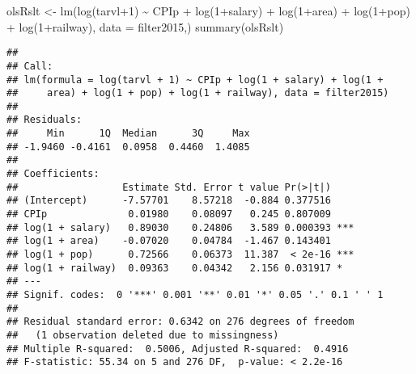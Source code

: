 \documentclass[
]{article}
\newenvironment{Shaded}{\begin{snugshade}}{\end{snugshade}}
\newcommand{\AttributeTok}[1]{\textcolor[rgb]{0.77,0.63,0.00}{#1}}
\newcommand{\DecValTok}[1]{\textcolor[rgb]{0.00,0.00,0.81}{#1}}
\newcommand{\FunctionTok}[1]{\textcolor[rgb]{0.00,0.00,0.00}{#1}}
\newcommand{\NormalTok}[1]{#1}
\newcommand{\OtherTok}[1]{\textcolor[rgb]{0.56,0.35,0.01}{#1}}
\newcommand{\SpecialCharTok}[1]{\textcolor[rgb]{0.00,0.00,0.00}{#1}}
\begin{document}
\begin{Shaded}
\begin{Highlighting}[]
\NormalTok{olsRslt }\OtherTok{\textless{}{-}} \FunctionTok{lm}\NormalTok{(}\FunctionTok{log}\NormalTok{(tarvl}\SpecialCharTok{+}\DecValTok{1}\NormalTok{) }\SpecialCharTok{\textasciitilde{}}\NormalTok{ CPIp }\SpecialCharTok{+}
                \FunctionTok{log}\NormalTok{(}\DecValTok{1}\SpecialCharTok{+}\NormalTok{salary) }\SpecialCharTok{+}
                \FunctionTok{log}\NormalTok{(}\DecValTok{1}\SpecialCharTok{+}\NormalTok{area) }\SpecialCharTok{+} \FunctionTok{log}\NormalTok{(}\DecValTok{1}\SpecialCharTok{+}\NormalTok{pop) }\SpecialCharTok{+}
                \FunctionTok{log}\NormalTok{(}\DecValTok{1}\SpecialCharTok{+}\NormalTok{railway),}
              \AttributeTok{data =}\NormalTok{ filter2015,)}
\FunctionTok{summary}\NormalTok{(olsRslt)}
\end{Highlighting}
\end{Shaded}

\begin{verbatim}
## 
## Call:
## lm(formula = log(tarvl + 1) ~ CPIp + log(1 + salary) + log(1 + 
##     area) + log(1 + pop) + log(1 + railway), data = filter2015)
## 
## Residuals:
##     Min      1Q  Median      3Q     Max 
## -1.9460 -0.4161  0.0958  0.4460  1.4085 
## 
## Coefficients:
##                  Estimate Std. Error t value Pr(>|t|)    
## (Intercept)      -7.57701    8.57218  -0.884 0.377516    
## CPIp              0.01980    0.08097   0.245 0.807009    
## log(1 + salary)   0.89030    0.24806   3.589 0.000393 ***
## log(1 + area)    -0.07020    0.04784  -1.467 0.143401    
## log(1 + pop)      0.72566    0.06373  11.387  < 2e-16 ***
## log(1 + railway)  0.09363    0.04342   2.156 0.031917 *  
## ---
## Signif. codes:  0 '***' 0.001 '**' 0.01 '*' 0.05 '.' 0.1 ' ' 1
## 
## Residual standard error: 0.6342 on 276 degrees of freedom
##   (1 observation deleted due to missingness)
## Multiple R-squared:  0.5006, Adjusted R-squared:  0.4916 
## F-statistic: 55.34 on 5 and 276 DF,  p-value: < 2.2e-16
\end{verbatim}
\end{document}
